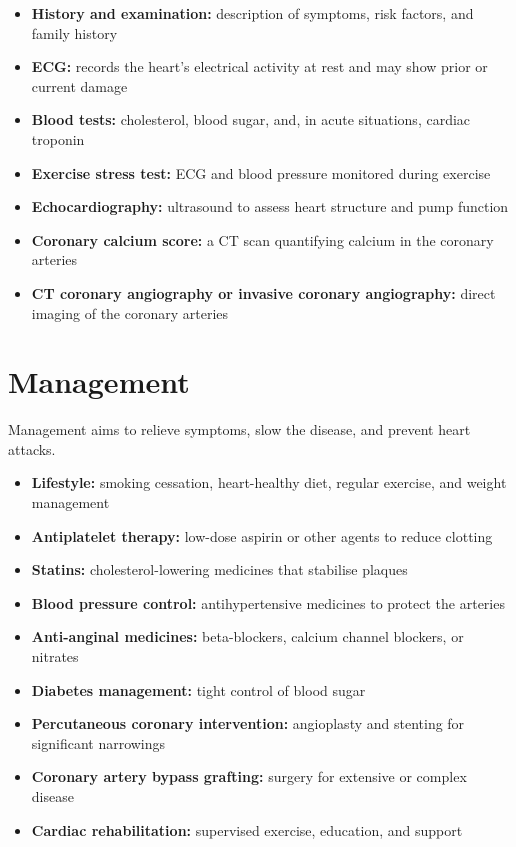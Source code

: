 \begin{itemize}
    \item \textbf{History and examination:} description of symptoms, risk factors, and family history
    \item \textbf{ECG:} records the heart's electrical activity at rest and may show prior or current damage
    \item \textbf{Blood tests:} cholesterol, blood sugar, and, in acute situations, cardiac troponin
    \item \textbf{Exercise stress test:} ECG and blood pressure monitored during exercise
    \item \textbf{Echocardiography:} ultrasound to assess heart structure and pump function
    \item \textbf{Coronary calcium score:} a CT scan quantifying calcium in the coronary arteries
    \item \textbf{CT coronary angiography or invasive coronary angiography:} direct imaging of the coronary arteries
\end{itemize}

\section*{Management}
Management aims to relieve symptoms, slow the disease, and prevent heart attacks.

\begin{itemize}
    \item \textbf{Lifestyle:} smoking cessation, heart-healthy diet, regular exercise, and weight management
    \item \textbf{Antiplatelet therapy:} low-dose aspirin or other agents to reduce clotting
    \item \textbf{Statins:} cholesterol-lowering medicines that stabilise plaques
    \item \textbf{Blood pressure control:} antihypertensive medicines to protect the arteries
    \item \textbf{Anti-anginal medicines:} beta-blockers, calcium channel blockers, or nitrates
    \item \textbf{Diabetes management:} tight control of blood sugar
    \item \textbf{Percutaneous coronary intervention:} angioplasty and stenting for significant narrowings
    \item \textbf{Coronary artery bypass grafting:} surgery for extensive or complex disease
    \item \textbf{Cardiac rehabilitation:} supervised exercise, education, and support
\end{itemize}

